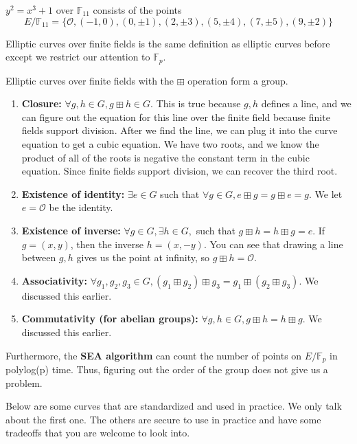 \begin{example}
    $y^2 = x^3 + 1$ over $\mathbb{F}_{11}$ consists of the points
    $$E / \mathbb{F}_{11} = \{\mathcal{O}, (-1, 0), (0, \pm 1), (2, \pm 3), (5, \pm 4), (7, \pm 5), (9, \pm 2)\}$$
\end{example}

Elliptic curves over finite fields is the same definition as elliptic curves before except we restrict our attention to $\mathbb{F}_p$.

\begin{proposition}
    Elliptic curves over finite fields with the $\boxplus$ operation form a group.
    \begin{enumerate}
        \item \textbf{Closure:} $\forall g, h \in G, g\boxplus h \in G$. This is true because $g,h$ defines a line, and we can figure out the equation for this line over the finite field because finite fields support division. After we find the line, we can plug it into the curve equation to get a cubic equation. We have two roots, and we know the product of all of the roots is negative the constant term in the cubic equation. Since finite fields support division, we can recover the third root.
        \item \textbf{Existence of identity:} $\exists e \in G $ such that $\forall g\in G, e \boxplus g = g \boxplus e = g$. We let $e = \mathcal{O}$ be the identity. 
        \item \textbf{Existence of inverse:} $\forall g \in G, \exists h \in G, $ such that $g \boxplus h = h \boxplus g = e$. If $g = (x,y)$, then the inverse $h = (x, -y)$. You can see that drawing a line between $g,h$ gives us the point at infinity, so $g \boxplus h = \mathcal{O}$.
        \item \textbf{Associativity:} $\forall g_1, g_2, g_3 \in G, (g_1 \boxplus g_2) \boxplus g_3 = g_1 \boxplus (g_2 \boxplus g_3)$. We discussed this earlier.
        \item \textbf{Commutativity (for abelian groups):} $\forall g,h \in G, g\boxplus h = h \boxplus g.$ We discussed this earlier.
    \end{enumerate}
\end{proposition}

Furthermore, the \textbf{SEA algorithm} can count the number of points on $E / \mathbb{F}_p$ in polylog(p) time. Thus, figuring out the order of the group does not give us a problem.

Below are some curves that are standardized and used in practice. We only talk about the first one. The others are secure to use in practice and have some tradeoffs that you are welcome to look into.

